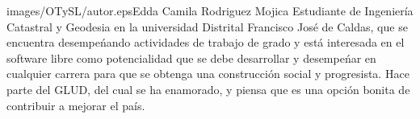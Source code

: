 \begin{multicols}{2}
\begin{bibliografia}
\end{bibliografia}


\begin{biografia}{images/OTySL/autor.eps}{Edda Camila Rodriguez Mojica} %
Estudiante de Ingeniería Catastral y Geodesia en la universidad Distrital Francisco José de Caldas, que se encuentra desempeńando actividades de trabajo de grado
y está interesada en el software libre como potencialidad que se debe desarrollar y desempeńar en cualquier carrera para que se obtenga una construcción social y progresista.
Hace parte del GLUD, del cual se ha enamorado, y piensa que es una opción bonita de contribuir a mejorar el país.  
\end{biografia}


\end{multicols} %


